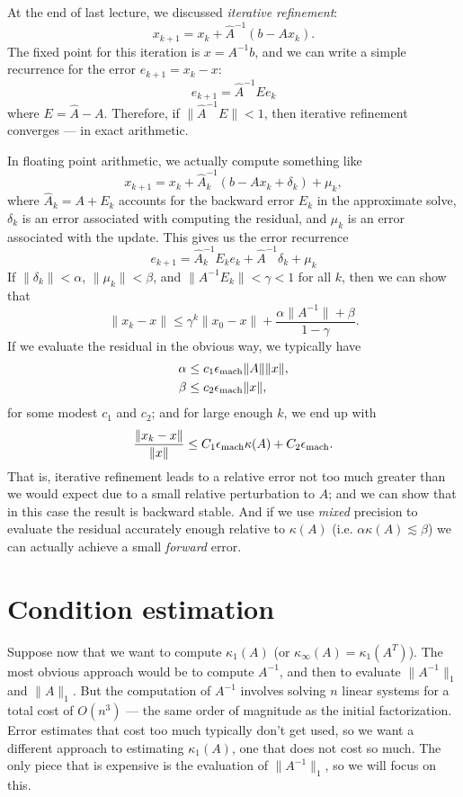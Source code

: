 \documentclass[12pt, leqno]{article} %
\begin{document}
At the end of last lecture, we discussed {\em iterative refinement}:
\[
  x_{k+1} = x_k + \hat{A}^{-1} (b - A x_{k}).
\]
The fixed point for this iteration is $x = A^{-1} b$, and we can write
a simple recurrence for the error $e_{k+1} = x_k-x$:
\[
  e_{k+1} = \hat{A}^{-1} E e_k
\]
where $E = \hat{A}-A$.  Therefore, if $\|\hat{A}^{-1} E\|<1$, then
iterative refinement converges --- in exact arithmetic.

In floating point arithmetic, we actually compute something like
\[
  x_{k+1} = x_k + \hat{A}_k^{-1} (b - A x_{k} + \delta_k) + \mu_k,
\]
where $\hat{A}_k = A + E_k$ accounts for the backward
error $E_k$ in the approximate solve,
$\delta_k$ is an error associated with computing the residual, and
$\mu_k$ is an error associated with the update.  This gives us the
error recurrence
\[
  e_{k+1} = \hat{A}_k^{-1} E_k e_k + \hat{A}^{-1} \delta_k + \mu_k
\]
If $\|\delta_k\| < \alpha$, $\|\mu_k\| < \beta$,
and $\|A^{-1} E_k\| < \gamma < 1$ for all $k$, then
we can show that
\[
  \|x_k-x\| \leq
    \gamma^k \|x_0-x\| +
    \frac{ \alpha \|A^{-1}\| + \beta }{1 - \gamma}.
\]
If we evaluate the residual in the obvious way, we typically have
\begin{align*}
  \alpha & \leq c_1 \epsilon_{\mathrm{mach}} \|A\| \|x\|, \\
  \beta & \leq c_2 \epsilon_{\mathrm{mach}} \|x\|,
\end{align*}
for some modest $c_1$ and $c_2$; and for large enough $k$, we end up with
\[
  \frac{\|x_k-x\|}{\|x\|} \leq C_1 \epsilon_{\mathrm{mach}} \kappa(A) + C_2 \epsilon_{\mathrm{mach}}.
\]
That is, iterative refinement leads to a relative error not too much
greater than we would expect due to a small relative perturbation to $A$;
and we can show that in this case the result is backward stable.
And if we use {\em mixed} precision to evaluate the residual accurately
enough relative to $\kappa(A)$ (i.e. $\alpha \kappa(A) \lesssim \beta$)
we can actually achieve a small {\em forward} error.
\section{Condition estimation}

Suppose now that we want to compute $\kappa_1(A)$
(or $\kappa_{\infty}(A) = \kappa_1(A^T)$).
The most obvious approach would be to compute $A^{-1}$, and then
to evaluate $\|A^{-1}\|_1$ and $\|A\|_1$.  But the computation of
$A^{-1}$ involves solving $n$ linear systems for a total cost of $O(n^3)$ ---
the same order of magnitude as the initial factorization.  Error estimates
that cost too much typically don't get used, so we want a different approach
to estimating $\kappa_1(A)$, one that does not cost so much.  The only piece
that is expensive is the evaluation of $\|A^{-1}\|_1$, so we will focus
on this.
\end{document}
